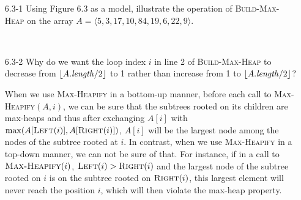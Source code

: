 \begin{enumerate}

\item[6.3-1]{Using Figure 6.3 as a model, illustrate the operation of
\textsc{Build-Max-Heap} on the array
$A = \langle 5, 3, 17, 10, 84, 19, 6, 22, 9 \rangle$.}

\begin{framed}
\begin{center}
\vspace{1em}\\
\end{center}
\end{framed}

\item[6.3-2]{Why do we want the loop index $i$ in line 2 of
\textsc{Build-Max-Heap} to decrease from $\lfloor A.\text{\emph{length}}/2\rfloor$ to
1 rather than increase from 1 to $\lfloor A.\text{\emph{length}}/2\rfloor$}?

\begin{framed}
When we use \textsc{Max-Heapify} in a bottom-up manner, before each call to
\textsc{Max-Heapify}$(A, i)$, we can be sure that the subtrees rooted on
its children are max-heaps and thus after exchanging $A[i]$ with
$\max(A[\textsc{Left}(i)], A[\textsc{Right}(i)])$, $A[i]$ will be the largest
node among the nodes of the subtree rooted at $i$. In contrast, when we use
\textsc{Max-Heapify} in a top-down manner, we can not be sure of that. For
instance, if in a call to $\textsc{Max-Heapify}(i)$,
$\textsc{Left}(i) > \textsc{Right}(i)$ and the largest node of the subtree
rooted on $i$ is on the subtree rooted on $\textsc{Right}(i)$, this largest
element will never reach the position $i$, which will then violate the max-heap
property.
\end{framed}


\end{enumerate}
